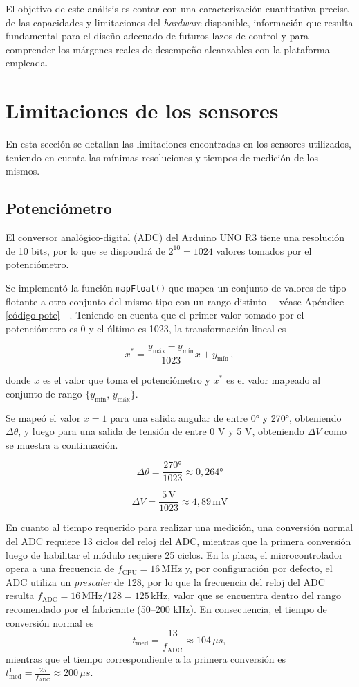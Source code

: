 \documentclass[a4paper,12pt]{article}
\begin{document}
El objetivo de este análisis es contar con una caracterización cuantitativa precisa de las capacidades y limitaciones del \textit{hardware} disponible, información que resulta fundamental para el diseño adecuado de futuros lazos de control y para comprender los márgenes reales de desempeño alcanzables con la plataforma empleada.

\section{Limitaciones de los sensores}

En esta sección se detallan las limitaciones encontradas en los sensores utilizados, teniendo en cuenta las mínimas resoluciones y tiempos de medición de los mismos.

\subsection{Potenciómetro}

El conversor analógico-digital (ADC) del Arduino UNO R3 tiene una resolución de 10 bits, por lo que se dispondrá de $2^{10} = 1024$ valores tomados por el potenciómetro.

Se implementó la función \texttt{mapFloat()} que mapea un conjunto de valores de tipo flotante a otro conjunto del mismo tipo con un rango distinto ---véase Apéndice \ref{código pote}---. Teniendo en cuenta que el primer valor tomado por el potenciómetro es 0 y el último es 1023, la transformación lineal es

\begin{equation}
    x^* = \frac{y_\text{máx} - y_\text{mín}}{1023}x + y_\text{mín}\,,
\end{equation}

donde $x$ es el valor que toma el potenciómetro y $x^*$ es el valor mapeado al conjunto de rango $\{y_\text{mín},\, y_\text{máx}\}$.

Se mapeó el valor $x = 1$ para una salida angular de entre 0° y 270°, obteniendo $\Delta\theta$, y luego para una salida de tensión de entre 0 V y 5 V, obteniendo $\Delta V$ como se muestra a continuación.

\[
\Delta\theta = \frac{270\text{°}}{1023} \approx 0,264\text{°}
\]

\[
\Delta V =\frac{5\,\text{V}}{1023} \approx 4,89 \, \text{mV}
\]

En cuanto al tiempo requerido para realizar una medición, una conversión normal del ADC requiere 13 ciclos del reloj del ADC, mientras que la primera conversión luego de habilitar el módulo requiere 25 ciclos. En la placa, el microcontrolador opera a una frecuencia de \( f_\text{CPU} = 16\,\text{MHz} \) y, por configuración por defecto, el ADC utiliza un \textit{prescaler} de 128, por lo que la frecuencia del reloj del ADC resulta \( f_\text{ADC} = 16\,\text{MHz} / 128 = 125\,\text{kHz} \), valor que se encuentra dentro del rango recomendado por el fabricante (50--200 kHz). En consecuencia, el tiempo de conversión normal es \[ t_\text{med} = \frac{13}{f_\text{ADC}} \approx 104\,\mu s, \] mientras que el tiempo correspondiente a la primera conversión es \( t_\text{med}^1 = \frac{25}{f_\text{ADC}} \approx 200\,\mu s \).
\end{document}
